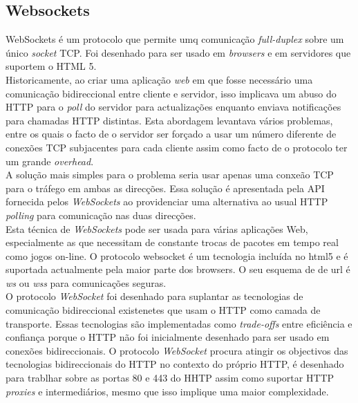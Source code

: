 \subsection{Websockets}
WebSockets é um protocolo que permite umq comunicação \textit{full-duplex} sobre um único \textit{socket} TCP. Foi desenhado para ser usado em \textit{browsers} e em servidores que suportem o HTML 5.\\
Historicamente, ao criar uma aplicação \textit{web} em que fosse necessário uma comunicação bidireccional entre cliente e servidor, isso implicava um abuso do HTTP para o \textit{poll} do servidor para actualizações enquanto enviava notificações para chamadas HTTP distintas. Esta abordagem levantava vários problemas, entre os quais o facto de o servidor ser forçado a usar um número diferente de conexões TCP subjacentes para cada cliente assim como facto de o protocolo ter um grande \textit{overhead}.\\
A solução mais simples para o problema seria usar apenas uma conxeão TCP para o tráfego em ambas as direcções. Essa solução é apresentada pela API fornecida pelos \textit{WebSockets} ao providenciar uma alternativa ao usual HTTP \textit{polling} para comunicação nas duas direcções.\\
Esta técnica de \textit{WebSockets} pode ser usada para várias aplicações Web, especialmente as que necessitam de constante trocas de pacotes em tempo real como jogos on-line. O protocolo websocket é um tecnologia incluída no html5 e é suportada actualmente pela maior parte dos browsers. O seu esquema de de url é \textit{ws} ou \textit{wss} para comunicações seguras. \\
O protocolo \textit{WebSocket} foi desenhado para suplantar as tecnologias de comunicação bidireccional existenetes que usam o HTTP como camada  de transporte. Essas tecnologias são implementadas como \textit{trade-offs} entre eficiência e confiança porque o HTTP não foi inicialmente desenhado para ser usado em conexões bidireccionais. O protocolo \textit{WebSocket} procura atingir os objectivos das tecnologias bidireccionais do HTTP no contexto do próprio HTTP, é desenhado para trablhar sobre as portas 80 e 443 do HHTP assim como suportar HTTP \textit{proxies} e intermediários, mesmo que isso implique uma maior complexidade.\\



